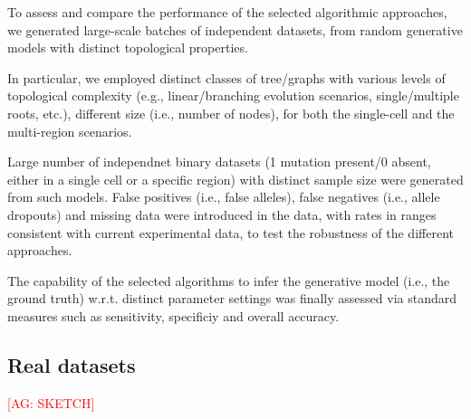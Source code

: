 \documentclass{article}
\begin{document}
To assess and compare the performance of the selected algorithmic approaches, we generated large-scale batches of independent datasets, from random generative models with distinct topological properties. 

In particular, we employed distinct classes of tree/graphs with various levels of topological complexity (e.g., linear/branching evolution scenarios, single/multiple roots, etc.), different size (i.e., number of nodes), for both the single-cell and the multi-region scenarios. 

Large number of independnet binary datasets (1 mutation present/0 absent, either in a single cell or a specific region) with distinct sample size were generated from such models. 
False positives (i.e., false alleles), false negatives (i.e., allele dropouts) and missing data were introduced in the data, with rates in ranges consistent with current experimental data, to test the robustness of the different approaches. 

The capability of the selected algorithms to infer the generative model (i.e., the ground truth) w.r.t. distinct parameter settings was finally assessed via standard measures such as sensitivity, specificiy and overall accuracy. 




\subsection{Real datasets}
\textcolor{red}{[AG: SKETCH]}
\end{document}
